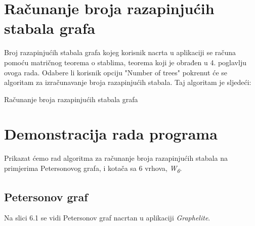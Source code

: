 \documentclass[times, utf8, zavrsni]{fer}
\begin{document}
\section{Računanje broja razapinjućih stabala grafa}

Broj razapinjućih stabala grafa kojeg korisnik nacrta u aplikaciji se računa pomoću matričnog teorema o stablima, teorema koji je obrađen u 4. poglavlju ovoga rada. Odabere li korisnik opciju "Number of trees" pokrenut će se algoritam za izračunavanje broja razapinjućih stabala. Taj algoritam je sljedeći:

\begin{algorithm}
	\caption{Računanje broja razapinjućih stabala grafa}
	\label{algo:spanning-trees}
	\begin{algorithmic}
						\ENDIF
					\ENDFOR
				\ELSE
				\ENDIF
			\ENDFOR
		\ENDFOR
	\end{algorithmic}
\end{algorithm}

\newpage

\section{Demonstracija rada programa}

Prikazat ćemo rad algoritma za računanje broja razapinjućih stabala na primjerima Petersonovog grafa, i kotača sa 6 vrhova, \textit{W\textsubscript{6}}.

\subsection{Petersonov graf}

Na slici 6.1 se vidi Petersonov graf nacrtan u aplikaciji \textit{Graphelite}.
\end{document}
